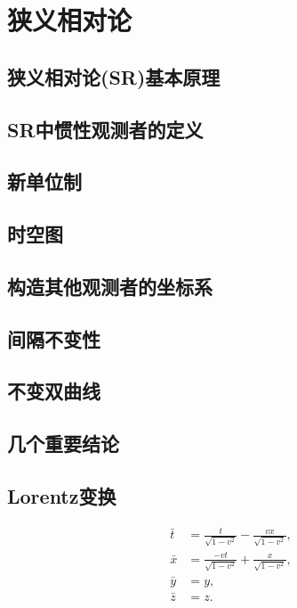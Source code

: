 

\chapter{狭义相对论}
\label{chap1}

\section{狭义相对论(SR)基本原理}
\label{sec1.1}

\section{SR中惯性观测者的定义}
\label{sec1.2}

\section{新单位制}
\label{sec1.3}

\section{时空图}
\label{sec1.4}

\section{构造其他观测者的坐标系}
\label{sec1.5}

\section{间隔不变性}
\label{sec1.6}

\section{不变双曲线}
\label{sec1.7}

\section{几个重要结论}
\label{sec1.8}

\section{Lorentz变换}
\label{sec1.9}
\begin{shaded}
\begin{equation}
\begin{split}
    \bar{t} &= \frac{t}{\sqrt{1 - v^2}} - \frac{vx}{\sqrt{1 - v^2}}, \\
    \bar{x} &= \frac{-vt}{\sqrt{1 - v^2}} + \frac{x}{\sqrt{1 - v^2}}, \\
    \bar{y} &= y, \\
    \bar{z} &= z.
\end{split}
\label{equ1.12}
\end{equation}
\end{shaded}

